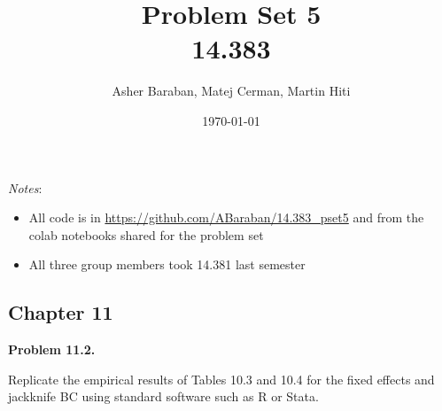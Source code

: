 \documentclass[11pt]{article}
\title{Problem Set 5 \\ 14.383}
\author{Asher Baraban, Matej Cerman, Martin Hiti}
\date{\today}
\newenvironment{problem}[1]
    {\bigskip\noindent\textbf{Problem #1.}\par\setlength{\parindent}{0pt}}
    {\medskip}
\begin{document}
\maketitle

\noindent \textit{Notes}:
\begin{itemize}
    \item All code is in \url{https://github.com/ABaraban/14.383_pset5} and from the colab notebooks shared for the problem set 
    \item All three group members took 14.381 last semester
\end{itemize}

\subsection*{Chapter 11} 

\begin{problem}{11.2}
Replicate the empirical results of Tables 10.3 and 10.4 for the
fixed effects and jackknife BC using standard software such
as R or Stata.
\end{problem}
\end{document}
